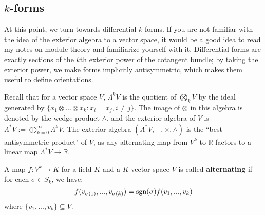 \subsection{$k$-forms}

At this point, we turn towards differential $k$-forms. If you are not familiar with the idea of the exterior algebra to a vector 
space, it would be a good idea to read my notes on module theory and familiarize yourself with it. Differential forms are 
exactly sections of the $k$th exterior power of the cotangent bundle; by taking the exterior power, we make forms 
implicitly antisymmetric, which makes them useful to define orientations. 

Recall that for a vector space $V$, $\Lambda^k V$ is the quotient of $\bigotimes_k V$ by the ideal generated by 
$\{x_1\otimes ...\otimes x_k : x_i = x_j, i\neq j\}$. The image of $\otimes$ in this algebra is denoted by the wedge product 
$\wedge$, and the exterior algebra of $V$ is $\Lambda^* V := \bigoplus_{k = 0}^\infty\Lambda^k V$. The exterior 
algebra $(\Lambda^* V, +, \times, \wedge)$ is the ``best antisymmetric product" of $V$, as any alternating map from 
$V^k$ to $\mathbb R$ factors to a linear map $\Lambda^* V\rightarrow\mathbb R$. 

\begin{definition}
	A map $f : V^k\rightarrow K$ for a field $K$ and a $K$-vector space $V$ is called \textbf{alternating} if for each $\sigma
	\in S_k$, we have:
	\begin{equation}
		f(v_{\sigma (1)}, ..., v_{\sigma (k)}) = \textnormal{sgn}(\sigma) f(v_1, ..., v_k)
	\end{equation}
	where $\{v_1, ..., v_k\}\subseteq V$. 
\end{definition}


